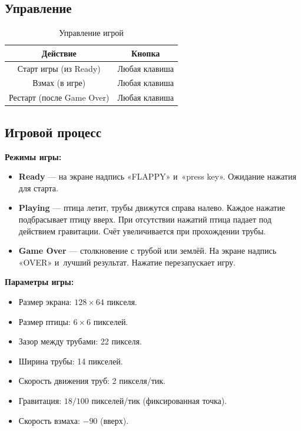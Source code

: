 \documentclass[a4paper,12pt]{article}
\begin{document}
\subsection{Управление}


\begin{table}[H]
    \centering
    \begin{tabular}{c|c}
        \toprule
        \textbf{Действие} & \textbf{Кнопка} \\
        \midrule
        Старт игры (из Ready) & Любая клавиша \\
        Взмах (в игре) & Любая клавиша \\
        Рестарт (после Game Over) & Любая клавиша \\
        \bottomrule
    \end{tabular}
    \caption{Управление игрой}
\end{table}


\subsection{Игровой процесс}

\textbf{Режимы игры:}
\begin{itemize}
    \item \textbf{Ready} — на экране надпись «FLAPPY» и~«press key». Ожидание нажатия для старта.
    \item \textbf{Playing} — птица летит, трубы движутся справа налево. Каждое нажатие подбрасывает птицу вверх. При отсутствии нажатий птица падает под действием гравитации. Счёт увеличивается при прохождении трубы.
    \item \textbf{Game Over} — столкновение с трубой или землёй. На экране надпись «OVER» и~лучший результат. Нажатие перезапускает игру.
\end{itemize}

\textbf{Параметры игры:}
\begin{itemize}
    \item Размер экрана: $128 \times 64$ пикселя.
    \item Размер птицы: $6 \times 6$ пикселей.
    \item Зазор между трубами: 22 пикселя.
    \item Ширина трубы: 14 пикселей.
    \item Скорость движения труб: 2 пикселя/тик.
    \item Гравитация: $18/100$ пикселей/тик (фиксированная точка).
    \item Скорость взмаха: $-90$ (вверх).
\end{itemize}
\end{document}
